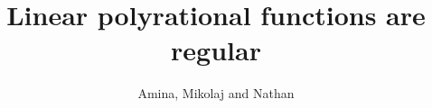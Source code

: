 \documentclass{article}
\begin{document}
 \title{Linear polyrational functions are regular}
 \author{Amina, Mikolaj and Nathan}
 \maketitle



\end{document}
